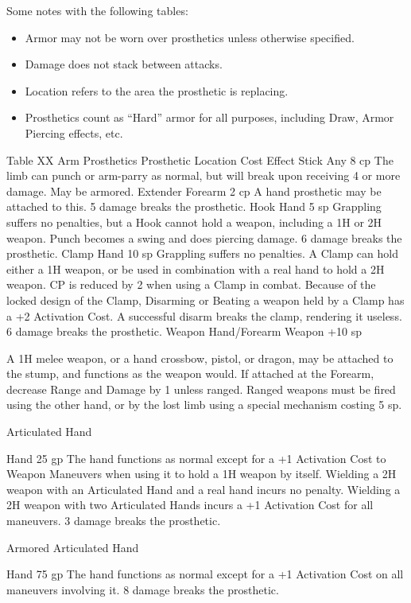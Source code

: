 \documentclass[oneside,11pt,english]{book}
\begin{document}
Some notes with the following tables: 
\begin{itemize}
\item Armor may not be worn over prosthetics unless otherwise specified. 
\item Damage does not stack between attacks. 
\item Location refers to the area the prosthetic is replacing. 
\item Prosthetics count as “Hard” armor for all purposes, including Draw, Armor Piercing effects, etc. 
\end{itemize}
 
Table XX Arm Prosthetics 
Prosthetic Location Cost Effect 
Stick Any 8 cp The limb can punch or arm-parry as normal, but will break upon 
receiving 4 or more damage. May be armored. 
Extender Forearm 2 cp A hand prosthetic may be attached to this. 5 damage breaks the 
prosthetic. 
Hook Hand 5 sp Grappling suffers no penalties, but a Hook cannot hold a weapon, 
including a 1H or 2H weapon. Punch becomes a swing and does 
piercing damage. 6 damage breaks the prosthetic. 
Clamp Hand 10 sp Grappling suffers no penalties. A Clamp can hold either a 1H weapon, 
or be used in combination with a real hand to hold a 2H weapon. CP 
is reduced by 2 when using a Clamp in combat. 
Because of the locked design of the Clamp, Disarming or Beating a 
weapon held by a Clamp has a +2 Activation Cost. 
A successful disarm breaks the clamp, rendering it useless. 6 damage 
breaks the prosthetic. 
Weapon Hand/Forearm Weapon 
+10 sp 

A 1H melee weapon, or a hand crossbow, pistol, or dragon, may be 
attached to the stump, and functions as the weapon would. If attached 
at the Forearm, decrease Range and Damage by 1 unless ranged. 
Ranged weapons must be fired using the other hand, or by the lost 
limb using a special mechanism costing 5 sp. 

Articulated 
Hand 

Hand 25 gp The hand functions as normal except for a +1 Activation Cost to 
Weapon Maneuvers when using it to hold a 1H weapon by itself. 
Wielding a 2H weapon with an Articulated Hand and a real hand 
incurs no penalty. Wielding a 2H weapon with two Articulated Hands 
incurs a +1 Activation Cost for all maneuvers. 3 damage breaks the 
prosthetic. 

Armored 
Articulated 
Hand 

Hand 75 gp The hand functions as normal except for a +1 Activation Cost on all 
maneuvers involving it. 8 damage breaks the prosthetic. 
\end{document}
